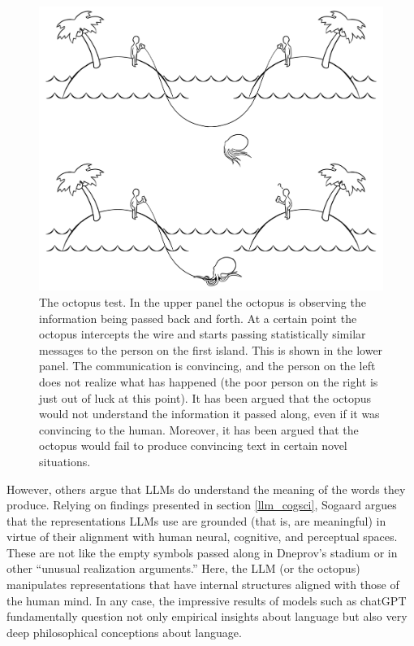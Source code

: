 \begin{figure}[h]
\centering
\includegraphics[scale=.20]{./images/octopusTest.png}
\caption[Soraya Boza.]{The octopus test. In the upper panel the octopus is observing the information being passed back and forth. At a certain point the octopus intercepts the wire and starts passing statistically similar messages to the person on the first island. This is shown in the lower panel. The communication is convincing, and the person on the left does not realize what has happened (the poor person on the right is just out of luck at this point). It has been argued that the octopus would not understand the information it passed along, even if it was convincing to the human. Moreover, it has been argued that the octopus would fail to produce convincing text in certain novel situations.}
\label{octopusTest}
\end{figure}

However, others argue that LLMs do understand the meaning of the words they produce. Relying on findings presented in section \ref{llm_cogsci}, Sogaard \cite{sogaard2023grounding} argues that the representations LLMs use are grounded (that is, are meaningful) in virtue of their alignment with human neural, cognitive, and perceptual spaces. These are not like the empty symbols passed along in Dneprov's stadium or in other ``unusual realization arguments.'' Here, the LLM (or the octopus) manipulates representations that have internal structures aligned with those of the human mind. In any case, the impressive results of models such as chatGPT fundamentally question not only empirical insights about language but also very deep philosophical conceptions about language.

